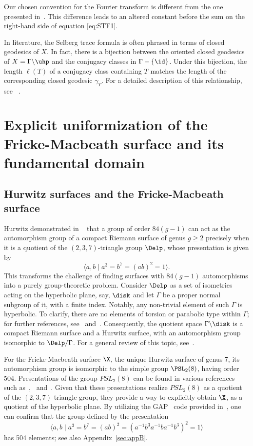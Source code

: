 Our chosen convention for the Fourier transform is different from the one presented in~\cite{MR2742784}.
This difference leads to an altered constant before the sum on the right-hand side of equation \eqref{eq:STF1}.

In literature, the Selberg trace formula is often phrased in terms of closed geodesics of $X$.
In fact, there is a bijection between the oriented closed geodesics of \(X = \Gamma\backslash \uhp\) and the conjugacy classes in \( \Gamma - \{\id\} \). 
Under this bijection, the length \( \ell(T) \) of a conjugacy class containing $T$ matches the length of the corresponding closed geodesic $\gamma_{T}$.
For a detailed description of this relationship, see ~\cite[Section 9.2]{MR2742784}.


\section{Explicit uniformization of the Fricke-Macbeath surface and its fundamental domain}
\subsection{Hurwitz surfaces and the Fricke-Macbeath surface}\label{subsec:hurwitzsurfaces}
Hurwitz demonstrated in ~\cite[§7]{hurwitz1893} that a group of order \(84(g - 1)\) can act as the automorphism group of a compact Riemann surface of genus \(g\geq 2\) precisely when it is a quotient of the $(2,3,7)$-triangle group $\Delp$, whose presentation is given by
\[\langle a, b \mid a^{3} = b^{7} = (ab)^{2} = 1 \rangle.\]
This transforms the challenge of finding surfaces with \(84(g - 1)\) automorphisms into a purely group-theoretic problem.
Consider $\Delp$ as a set of isometries acting on the hyperbolic plane, say, $\disk$ and let $\Gamma$ be a proper normal subgroup of it, with a finite index.
Notably, any non-trivial element of such $\Gamma$ is hyperbolic.
To clarify, there are no elements of torsion or parabolic type within $\Gamma$; for further references, see~\cite[p. 531]{macbeath1965} and~\cite[p. 4]{Vogeler2003}.
Consequently, the quotient space $\Gamma\backslash \disk$ is a compact Riemann surface and a Hurwitz surface, with an automorphism group isomorphic to $\Delp/\Gamma$.
For a general review of this topic, see~\cite{MR1041434, MR1722414}.

For the Fricke-Macbeath surface $\X$, the unique Hurwitz surface of genus 7, its automorphism group is isomorphic to the simple group $\PSL_2(8)$, having order 504.
Presentations of the group $PSL_2(8)$ can be found in various references such as~\cite{burnside1899},~\cite[p. 97]{coxeter_moser_1957} and~\cite{MR0174621}.
Given that these presentations realize $PSL_2(8)$ as a quotient of the $(2,3,7)$-triangle group, they provide a way to explicitly obtain $\X$, as a quotient of the hyperbolic plane.
By utilizing the GAP~\cite{GAP4} code provided in~\cite{Vogeler2003},
one can confirm that the group defined by the presentation
\[\langle a, b \mid a^{3} = b^{7} = (ab)^{2} = (a^{-1} b^3 a^{-1} b a^{-1} b^3)^2 = 1\rangle\]
has 504 elements; see also Appendix~\ref{sec:appB}.

